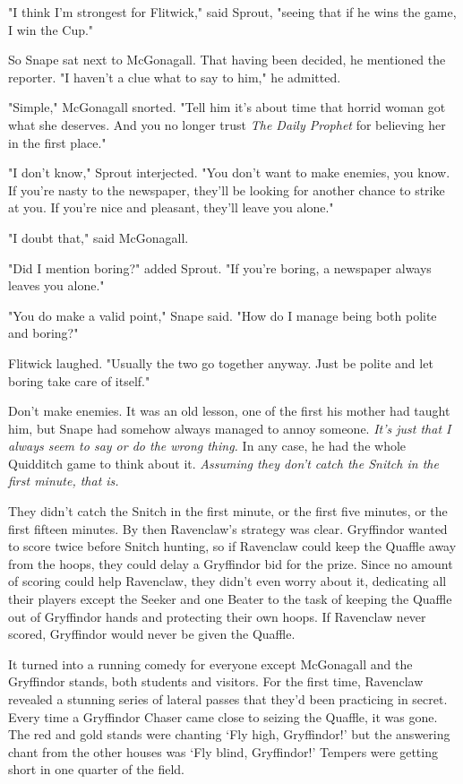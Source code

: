\documentclass[a4paper,11pt]{article}
\begin{document}
"I think I'm strongest for Flitwick," said Sprout, "seeing that if he wins the game, I win the Cup."

So Snape sat next to McGonagall. That having been decided, he mentioned the reporter. "I haven't a clue what to say to him," he admitted.

"Simple," McGonagall snorted. "Tell him it's about time that horrid woman got what she deserves. And you no longer trust \emph{The Daily Prophet} for believing her in the first place."

"I don't know," Sprout interjected. "You don't want to make enemies, you know. If you're nasty to the newspaper, they'll be looking for another chance to strike at you. If you're nice and pleasant, they'll leave you alone."

"I doubt that," said McGonagall.

"Did I mention boring?" added Sprout. "If you're boring, a newspaper always leaves you alone."

"You do make a valid point," Snape said. "How do I manage being both polite and boring?"

Flitwick laughed. "Usually the two go together anyway. Just be polite and let boring take care of itself."

Don't make enemies. It was an old lesson, one of the first his mother had taught him, but Snape had somehow always managed to annoy someone. \emph{It's just that I always seem to say or do the wrong thing.} In any case, he had the whole Quidditch game to think about it. \emph{Assuming they don't catch the Snitch in the first minute, that is.}

They didn't catch the Snitch in the first minute, or the first five minutes, or the first fifteen minutes. By then Ravenclaw's strategy was clear. Gryffindor wanted to score twice before Snitch hunting, so if Ravenclaw could keep the Quaffle away from the hoops, they could delay a Gryffindor bid for the prize. Since no amount of scoring could help Ravenclaw, they didn't even worry about it, dedicating all their players except the Seeker and one Beater to the task of keeping the Quaffle out of Gryffindor hands and protecting their own hoops. If Ravenclaw never scored, Gryffindor would never be given the Quaffle.

It turned into a running comedy for everyone except McGonagall and the Gryffindor stands, both students and visitors. For the first time, Ravenclaw revealed a stunning series of lateral passes that they'd been practicing in secret. Every time a Gryffindor Chaser came close to seizing the Quaffle, it was gone. The red and gold stands were chanting `Fly high, Gryffindor!' but the answering chant from the other houses was `Fly blind, Gryffindor!' Tempers were getting short in one quarter of the field.
\end{document}
